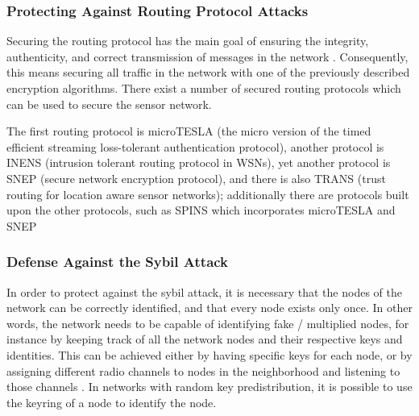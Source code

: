 \documentclass[12pt,a4paper,twoside]{report}
\begin{document}
\subsubsection{Protecting Against Routing Protocol Attacks}
Securing the routing protocol has the main goal of ensuring the integrity, authenticity, and correct transmission of messages in the network \cite{sen:2009}. Consequently, this means securing all traffic in the network with one of the previously described encryption algorithms. There exist a number of secured routing protocols which can be used to secure the sensor network. \par
The first routing protocol is \si{micro}TESLA (the micro version of the timed efficient streaming loss-tolerant authentication protocol), another protocol is INENS (intrusion tolerant routing protocol in WSNs), yet another protocol is SNEP (secure network encryption protocol), and there is also TRANS (trust routing for location aware sensor networks); additionally there are protocols built upon the other protocols, such as SPINS which incorporates \si{micro}TESLA and SNEP \cite{sen:2009}\par
\subsubsection{Defense Against the Sybil Attack}
In order to protect against the sybil attack, it is necessary that the nodes of the network can be correctly identified, and that every node exists only once. In other words, the network needs to be capable of identifying fake / multiplied nodes, for instance by keeping track of all the network nodes and their respective keys and identities. This can be achieved either by having specific keys for each node, or by assigning different radio channels to nodes in the neighborhood and listening to those channels \cite{sen:2009}. In networks with random key predistribution, it is possible to use the keyring of a node to identify the node.\par
\end{document}
